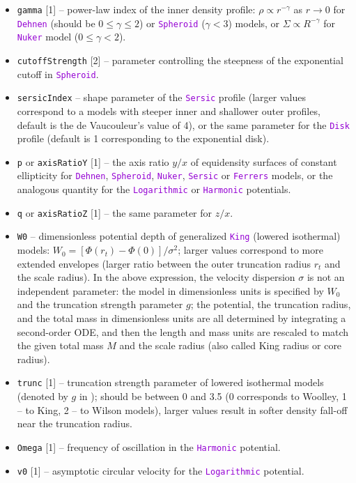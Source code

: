 \documentclass[12pt]{article}
\newcommand{\ttt}[1]{\textcolor{darkviolet}{\texttt{#1}}}
\newcommand{\ppp}[1]{\textcolor{darkolive} {\texttt{#1}}}
\begin{document}
\begin{itemize}
\item \ppp{gamma} [1] -- power-law index of the inner density profile: $\rho \propto r^{-\gamma}$ as $r\to 0$ for \ttt{Dehnen} (should be $0\le\gamma\le 2$) or \ttt{Spheroid} ($\gamma<3$) models, or $\Sigma \propto R^{-\gamma}$ for \ttt{Nuker} model ($0\le \gamma < 2$).
\item \ppp{cutoffStrength} [2] -- parameter controlling the steepness of the exponential cutoff in \ttt{Spheroid}.
\item \ppp{sersicIndex} -- shape parameter of the \ttt{Sersic} profile (larger values correspond to a models with steeper inner and shallower outer profiles, default is the de Vaucouleur's value of 4), or the same parameter for the \ttt{Disk} profile (default is 1 corresponding to the exponential disk).
\item \ppp{p} or \ppp{axisRatioY} [1] -- the axis ratio $y/x$ of equidensity surfaces of constant ellipticity for \ttt{Dehnen}, \ttt{Spheroid}, \ttt{Nuker}, \ttt{Sersic} or \ttt{Ferrers} models, or the analogous quantity for the \ttt{Logarithmic} or \ttt{Harmonic} potentials.
\item \ppp{q} or \ppp{axisRatioZ} [1] -- the same parameter for $z/x$.
\item \ppp{W0} -- dimensionless potential depth of generalized \ttt{King} (lowered isothermal) models: $W_0 = [ \Phi(r_t) - \Phi(0) ] / \sigma^2$; larger values correspond to more extended envelopes (larger ratio between the outer truncation radius $r_t$ and the scale radius). In the above expression, the velocity dispersion $\sigma$ is not an independent parameter: the model in dimensionless units is specified by $W_0$ and the truncation strength parameter $g$; the potential, the truncation radius, and the total mass in dimensionless units are all determined by integrating a second-order ODE, and then the length and mass units are rescaled to match the given total mass $M$ and the scale radius (also called King radius or core radius).
\item \ppp{trunc} [1] -- truncation strength parameter of lowered isothermal models (denoted by $g$ in \cite{GielesZocchi2015}); should be between 0 and 3.5 (0 corresponds to Woolley, 1 -- to King, 2 -- to Wilson models), larger values result in softer density fall-off near the truncation radius.
\item \ppp{Omega} [1] -- frequency of oscillation in the \ttt{Harmonic} potential.
\item \ppp{v0} [1] -- asymptotic circular velocity for the \ttt{Logarithmic} potential.

\end{itemize}
\end{document}
